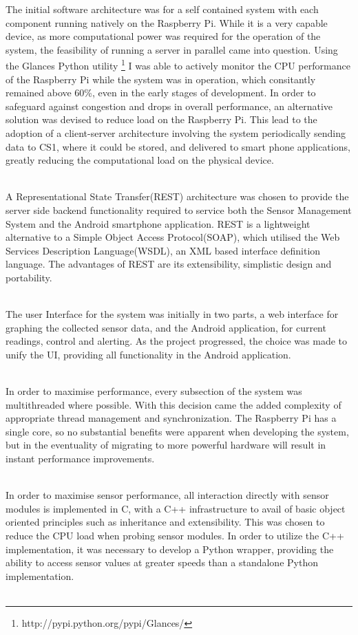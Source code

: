 \documentclass{article}
\begin{document}
The initial software architecture was for a self contained system with each component running natively on the Raspberry Pi. While it is a very capable device, as more computational power was required for the operation of the system, the feasibility of running a server in parallel came into question. Using the Glances Python utility \footnote{http://pypi.python.org/pypi/Glances/} I was able to actively monitor the CPU performance of the Raspberry Pi while the system was in operation, which consitantly remained above 60\%, even in the early stages of development. In order to safeguard against congestion and drops in overall performance, an alternative solution was devised to reduce load on the Raspberry Pi. This lead to the adoption of a client-server architecture involving the system periodically sending data to CS1, where it could be stored, and delivered to smart phone applications, greatly reducing the computational load on the physical device. \\\

A Representational State Transfer(REST) architecture was chosen to provide the server side backend functionality required to service both the Sensor Management System and the Android smartphone application.  REST is a lightweight alternative to a Simple Object Access Protocol(SOAP), which utilised the Web Services Description Language(WSDL), an XML based interface definition language. The advantages of REST are its extensibility, simplistic design and portability. \\\

The user Interface for the system was initially in two parts, a web interface for graphing the collected sensor data, and the Android application, for current readings, control and alerting. As the project progressed, the choice was made to unify the UI, providing all functionality in the Android application.  \\\

In order to maximise performance, every subsection of the system was multithreaded where possible. With this decision came the added complexity of appropriate thread management and synchronization. The Raspberry Pi has a single core, so no substantial benefits were apparent when developing the system, but in the eventuality of migrating to more powerful hardware will result in instant performance improvements. \\\

In order to maximise sensor performance, all interaction directly with sensor modules is implemented in C, with a C++ infrastructure to avail of basic object oriented principles such as inheritance and extensibility. This was chosen to reduce the CPU load when probing sensor modules. In order to utilize the C++ implementation, it was necessary to develop a Python wrapper, providing the ability to access sensor values at greater speeds than a standalone Python implementation. \\\
\end{document}
